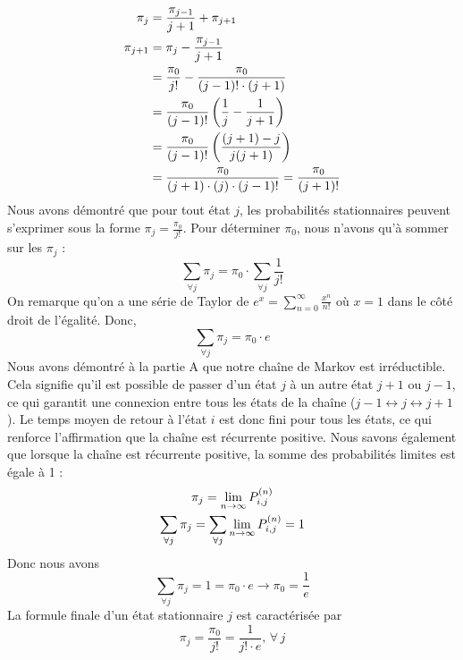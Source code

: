 \documentclass{article}
\begin{document}
\begin{align}
    \pi_j&=\frac{\pi_{j-1}}{j+1}+\pi_{j+1} \notag \\
    \pi_{j+1}&=\pi_j-\frac{\pi_{j-1}}{j+1} \notag \\
    &=\frac{\pi_0}{j!}-\frac{\pi_0}{(j-1)!\cdot (j+1)} \notag \\
    &=\frac{\pi_0}{(j-1)!}\left(\frac{1}{j}-\frac{1}{j+1}\right) \notag \\
    &=\frac{\pi_0}{(j-1)!}\left(\frac{(j+1)-j}{j(j+1)}\right) \notag \\
    &=\frac{\pi_0}{(j+1)\cdot (j)\cdot (j-1)!}=\frac{\pi_0}{(j+1)!}
\end{align}
Nous avons démontré que pour tout état $j$, les probabilités stationnaires peuvent s'exprimer 
sous la forme $\pi_j=\frac{\pi_0}{j!}$. Pour déterminer $\pi_0$, nous n'avons qu'à sommer sur les $\pi_j$ :
\[
    \sum_{\forall j}\pi_j=\pi_0\cdot\sum_{\forall j}\frac{1}{j!}
\]
On remarque qu'on a une série de Taylor de $e^x=\sum_{n=0}^{\infty}\frac{x^n}{n!}$ où 
$x=1$ dans le côté droit de l'égalité. Donc,
\[
    \sum_{\forall j}\pi_j=\pi_0\cdot e
\]
Nous avons démontré à la partie A que notre chaîne de Markov est irréductible. Cela 
signifie qu'il est possible de passer d'un état \( j \) à un autre état \( j+1 \) ou 
\( j-1 \), ce qui garantit une connexion entre tous les états de la chaîne (\( j-1 \leftrightarrow j \leftrightarrow j+1 \)). 
Le temps moyen de retour à l'état \( i \) est donc fini pour tous les états, 
ce qui renforce l'affirmation que la chaîne est récurrente positive. Nous savons également que lorsque la chaîne est récurrente positive, la somme des 
probabilités limites est égale à 1 :
\begin{gather}
    \pi_j=\lim_{n\to\infty}P_{i,j}^{(n)} \\
    \sum_{\forall j}\pi_j=\sum_{\forall j}\lim_{n\to\infty}P_{i,j}^{(n)}=1 \notag
\end{gather}
Donc nous avons
\[
    \sum_{\forall j}\pi_j=1=\pi_0\cdot e\to \pi_0=\frac{1}{e}
\]
La formule finale d'un état stationnaire $j$ est caractérisée par
\begin{equation}
    \pi_j=\frac{\pi_0}{j!}=\frac{1}{j!\cdot e},\, \forall\, j
\end{equation}
\end{document}

